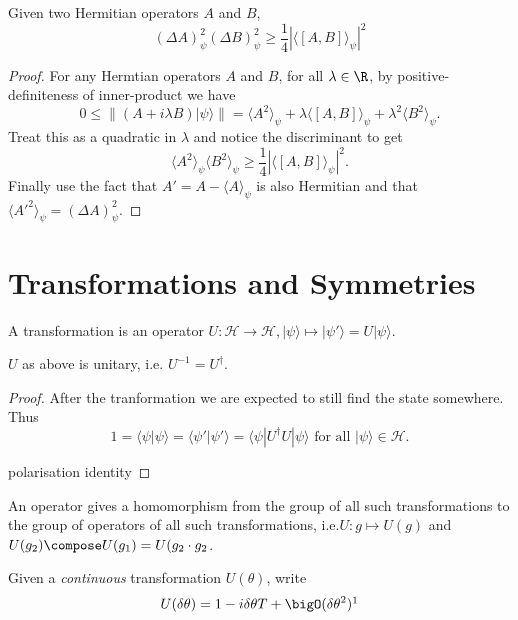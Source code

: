 \documentclass[a4paper]{article}
\renewcommand*{\H}{\mathcal{H}}
\theoremstyle{definition}
\begin{document}
\begin{proposition}
  Given two Hermitian operators \(A\) and \(B\),
  \[
    (\Delta A)_\psi^2(\Delta B)_\psi^2 \geq \frac{1}{4}|\langle[A,B]\rangle_\psi|^2
  \]
\end{proposition}

\begin{proof}
  For any Hermtian operators \(A\) and \(B\), for all \(\lambda \in \R\), by positive-definiteness of inner-product we have
  \[
    0 \leq \|(A+i\lambda B)|\psi\rangle\| = \langle A^2\rangle_\psi + \lambda\langle[A,B]\rangle_\psi + \lambda^2\langle B^2\rangle_\psi.
  \]
  Treat this as a quadratic in \(\lambda\) and notice the discriminant to get
  \[
    \langle A^2\rangle_\psi \langle B^2\rangle_\psi \geq \frac{1}{4}|\langle[A,B]\rangle_\psi|^2.
  \]
  Finally use the fact that \(A'=A-\langle A\rangle_\psi\) is also Hermitian and that \(\langle A'^2\rangle_\psi = (\Delta A)_\psi^2\).
\end{proof}

\section{Transformations and Symmetries}

A transformation is an operator \(U:\H\to \H, |\psi\rangle\mapsto |\psi'\rangle = U|\psi\rangle\).

\begin{proposition}
  \(U\) as above is unitary, i.e. \(U^{-1} = U^\dag\).
\end{proposition}

\begin{proof}
  After the tranformation we are expected to still find the state somewhere. Thus
  \[
    1 = \langle \psi|\psi\rangle = \langle \psi'|\psi' \rangle = \langle \psi |U^\dag U|\psi \rangle \text{ for all } |\psi\rangle \in \H.
  \]

  polarisation identity
\end{proof}

An operator gives a homomorphism from the group of all such transformations to the group of operators of all such transformations, i.e.\(U: g\mapsto U(g)\) and \(U(g_2)\compose U(g_1) = U(g_2\cdot g_2\).

\begin{definition}[Generator]
  Given a \emph{continuous} transformation \(U(\theta)\), write
  \[
    U(\delta\theta) = 1 - i \delta\theta T + \bigO(\delta\theta^2)\footnotemark
  \]
\end{definition}
\end{document}
